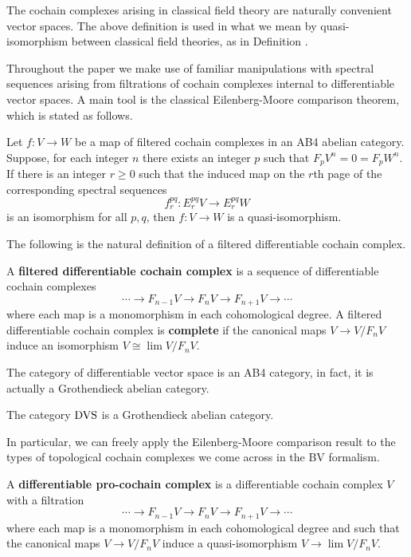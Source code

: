 \documentclass[10pt, oneside]{article}
\begin{document}
The cochain complexes arising in classical field theory are naturally convenient vector spaces. 
The above definition is used in what we mean by quasi-isomorphism between classical field theories, as in Definition .

Throughout the paper we make use of familiar manipulations with spectral sequences arising from filtrations of cochain complexes internal to differentiable vector spaces. 
A main tool is the classical Eilenberg-Moore comparison theorem, which is stated as follows.

\begin{thm}
Let $f : V \to W$ be a map of filtered cochain complexes in an AB4 abelian category.
Suppose, for each integer $n$ there exists an integer $p$ such that $F_p V^n = 0 = F_p W^n$.
If there is an integer $r \geq 0$ such that the induced map on the $r$th page of the corresponding spectral sequences 
\[
f_r^{pq} :  E_r^{pq} V \to E_r^{pq} W
\]
is an isomorphism for all $p,q$, then $f : V \to W$ is a quasi-isomorphism. 
\end{thm}

The following is the natural definition of a filtered differentiable cochain complex. 

\begin{definition}
A {\bf filtered differentiable cochain complex} is a sequence of differentiable cochain complexes
\[
\cdots \to F_{n-1} V \to F_{n} V \to F_{n+1}V \to \cdots
\]
where each map is a monomorphism in each cohomological degree. 
A filtered differentiable cochain complex is {\bf complete} if the canonical maps $V \to V / F_n V$ induce an isomorphism $V \cong \lim V / F_n V$. 
\end{definition}

The category of differentiable vector space is an AB4 category, in fact, it is actually a Grothendieck abelian category. 

\begin{thm}
The category ${\rm DVS}$ is a Grothendieck abelian category.
\end{thm}

In particular, we can freely apply the Eilenberg-Moore comparison result to the types of topological cochain complexes we come across in the BV formalism. 

\begin{definition}\label{dfn: pro}
A {\bf differentiable pro-cochain complex} is a differentiable cochain complex $V$ with a filtration
\[
\cdots \to F_{n-1} V \to F_{n} V \to F_{n+1}V \to \cdots
\]
where each map is a monomorphism in each cohomological degree and such that the canonical maps $V \to V / F_n V$ induce a quasi-isomorphism $V \to \lim V / F_n V$. 
\end{definition}
\end{document}

